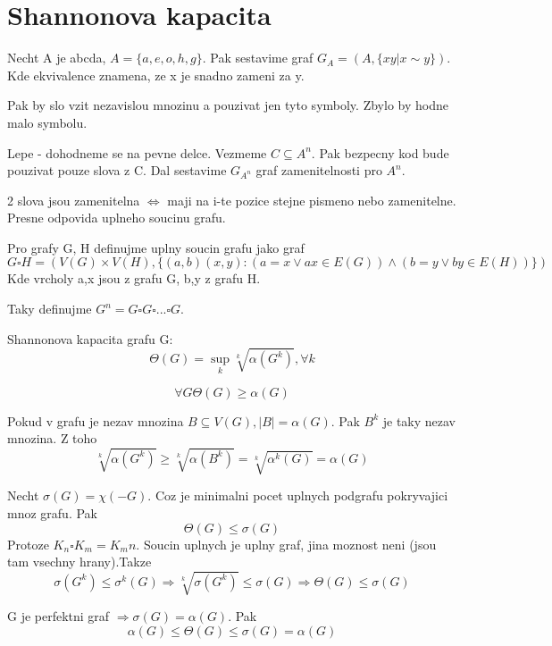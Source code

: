 \section{\texorpdfstring{Shannonova kapacita}{Shannonova kapacita}}
\vspace{5mm}
\large

\begin{definition}
Necht A je abcda, $A = \{a, e, o, h, g\}$.
Pak sestavime graf $G_A = (A, \{xy | x \sim y \})$. Kde ekvivalence znamena, ze x je snadno zameni za y.
\end{definition}
Pak by slo vzit nezavislou mnozinu a pouzivat jen tyto symboly. Zbylo by hodne malo symbolu.

Lepe - dohodneme se na pevne delce. Vezmeme $C \subseteq A^n$. Pak bezpecny kod bude pouzivat pouze slova z C.
Dal sestavime $G_{A^n}$ graf zamenitelnosti pro $A^n$.

\begin{observation}
	2 slova jsou zamenitelna $\iff$ maji na i-te pozice stejne pismeno nebo zamenitelne. Presne odpovida uplneho soucinu grafu.
\end{observation}

\begin{definition}
	Pro grafy G, H definujme uplny soucin grafu jako graf
\[ G \square H = (V(G) \times V(H), \{(a, b)(x, y): (a = x \lor ax \in E(G)) \land (b = y \lor by \in E(H))\}) \]
Kde vrcholy a,x jsou z grafu G, b,y z grafu H.

	Taky definujme $G^n = G \square G \square ... \square G$.
\end{definition}
\begin{definition}
	Shannonova kapacita grafu G:
	\[ \Theta(G) = \sup_k \sqrt[k]{\alpha(G^k)}, \forall k \]
\end{definition}
\begin{observation}
	\[\forall G \Theta(G) \geq \alpha(G)\]

	Pokud v grafu je nezav mnozina $B \subseteq V(G), |B| = \alpha(G)$. Pak $B^k$ je taky nezav mnozina.
	Z toho
	\[ \sqrt[k]{\alpha(G^k)} \geq \sqrt[k]{\alpha(B^k)} = \sqrt[k]{\alpha^k(G)} = \alpha(G) \]
\end{observation}
\begin{observation}
	Necht $\sigma(G) = \chi(-G)$. Coz je minimalni pocet uplnych podgrafu pokryvajici mnoz grafu. Pak
	\[ \Theta(G) \leq \sigma(G) \]
	Protoze $K_n \square K_m = K_mn$. Soucin uplnych je uplny graf, jina moznost neni (jsou tam vsechny hrany).Takze
	\[ \sigma(G^k) \leq \sigma^k(G) \Rightarrow \sqrt[k]{\sigma(G^k)} \leq \sigma(G) \Rightarrow \Theta(G) \leq \sigma(G) \]
\end{observation}
\begin{observation}
	G je perfektni graf $\Rightarrow \sigma(G) = \alpha(G)$. Pak
	\[ \alpha(G) \leq \Theta(G) \leq \sigma(G) = \alpha(G) \]
\end{observation}

